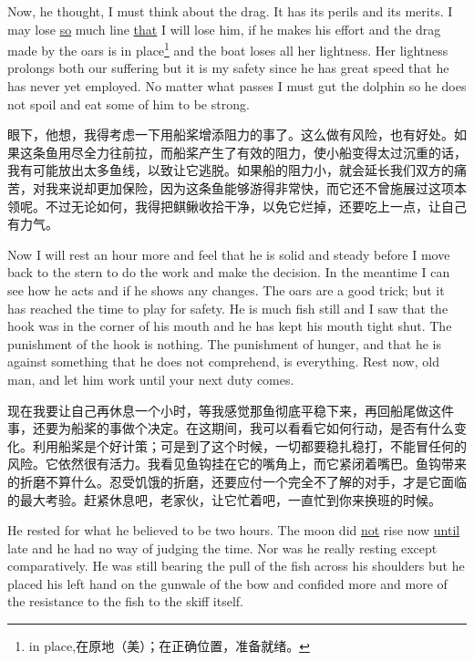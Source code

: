 \begin{paracol}{2}
Now, he thought, I must think about the drag. It has its \glspl{peril} and
its \glspl{merit}. I may lose \uline{so} much line \uline{that} I will lose
him, if he makes his effort and the drag made by the oars is in
place\footnote{in place,在原地（美）；在正确位置，准备就绪。} and the boat
loses all her \gls{lightness}. Her lightness \glspl{prolong} both our
suffering but it is my safety since he has great speed that he has never yet
\gls{employed}. No matter what passes I must \gls{gut} the dolphin so he
does not spoil and eat some of him to be strong.

\switchcolumn

眼下，他想，我得考虑一下用船桨增添阻力的事了。这么做有风险，也有好处。如果这条鱼用尽全力往前拉，而船桨产生了有效的阻力，使小船变得太过沉重的话，我有可能放出太多鱼线，以致让它逃脱。如果船的阻力小，就会延长我们双方的痛苦，对我来说却更加保险，因为这条鱼能够游得非常快，而它还不曾施展过这项本领呢。不过无论如何，我得把鲯鳅收拾干净，以免它烂掉，还要吃上一点，让自己有力气。

\switchcolumn*

Now I will rest an hour more and feel that he is solid and steady before I
move back to the stern to do the work and make the \gls{decision}. In the
\gls{meantime} I can see how he acts and if he shows any changes. The oars
are a good trick; but it has reached the time to play for safety. He is much
fish still and I saw that the hook was in the corner of his mouth and he has
kept his mouth tight shut. The \gls{punishment} of the hook is nothing. The
punishment of hunger, and that he is against something that he does not
\gls{comprehend}, is everything. Rest now, old man, and let him work until your
next duty comes.

\switchcolumn

现在我要让自己再休息一个小时，等我感觉那鱼彻底平稳下来，再回船尾做这件事，还要为船桨的事做个决定。在这期间，我可以看看它如何行动，是否有什么变化。利用船桨是个好计策；可是到了这个时候，一切都要稳扎稳打，不能冒任何的风险。它依然很有活力。我看见鱼钩挂在它的嘴角上，而它紧闭着嘴巴。鱼钩带来的折磨不算什么。忍受饥饿的折磨，还要应付一个完全不了解的对手，才是它面临的最大考验。赶紧休息吧，老家伙，让它忙着吧，一直忙到你来换班的时候。

\switchcolumn*

He rested for what he believed to be two hours. The moon did \uline{not} rise
now \uline{until} late and he had no way of \gls{judging} the time. Nor was he
really resting except \gls{comparatively}. He was still \gls{bearing} the
pull of the fish across his shoulders but he placed his left hand on the
gunwale of the bow and \gls{confided} more and more of the \gls{resistance}
to the fish to the skiff itself.


\end{paracol}
